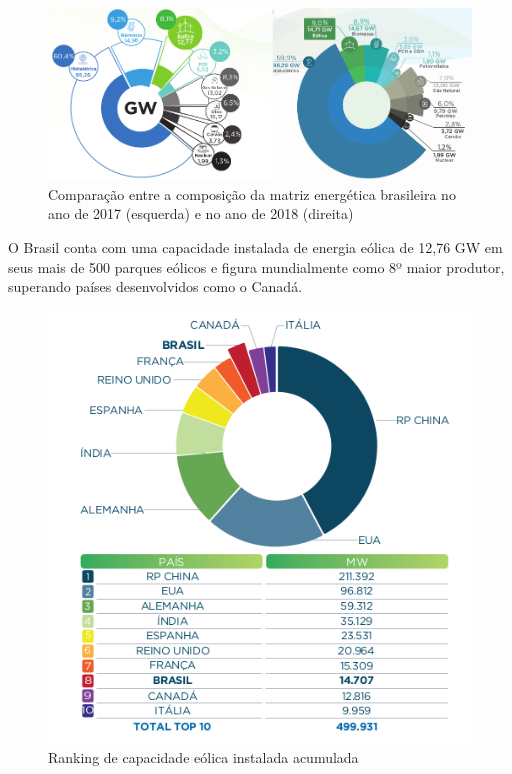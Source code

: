 \documentclass[
	12pt,				%
	openright,			%
	oneside,			%
	a4paper,			%
	english,			%
	french,				%
	spanish,			%
	brazil				%
	]{abntex2}
\begin{document}
\begin{figure}[h]
    \centering
	\includegraphics[width=\textwidth]{abe_2017_2018}
	\caption{Comparação entre a composição da matriz energética brasileira no ano de 2017 (esquerda) e no ano de 2018 (direita)}
\end{figure}
\FloatBarrier

O Brasil conta com uma capacidade instalada de energia eólica de 12,76 GW em seus mais de 500 parques eólicos e figura mundialmente como 8º maior produtor, superando países desenvolvidos como o Canadá.

\begin{figure}[h]
    \centering
	\includegraphics[scale=0.6]{abe_maiores_produtores}
	\caption{Ranking de capacidade eólica instalada acumulada}
\end{figure}
\FloatBarrier
\end{document}
